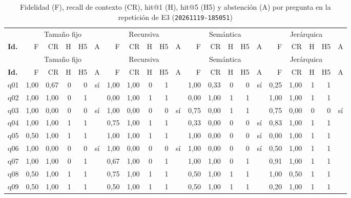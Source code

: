 \begin{scriptsize}
\setlength{\tabcolsep}{1.8pt}\renewcommand{\arraystretch}{0.92}
\begin{longtable}{@{}l rrrrc rrrrc rrrrc rrrrc@{}}
\caption[Ejecución repetida de E3, por pregunta]{Fidelidad (F), recall de contexto (CR), hit@1 (H), hit@5 (H5) y abstención (A) por pregunta en la repetición de E3 (\texttt{20261119-185051})}\label{tab:ap-e3-rep} \\
\toprule
& \multicolumn{5}{c}{Tamaño fijo} & \multicolumn{5}{c}{Recursiva} & \multicolumn{5}{c}{Semántica} & \multicolumn{5}{c}{Jerárquica} \\
\cmidrule(lr){2-6}\cmidrule(lr){7-11}\cmidrule(lr){12-16}\cmidrule(lr){17-21}
\textbf{Id.} & F & CR & H & H5 & A & F & CR & H & H5 & A & F & CR & H & H5 & A & F & CR & H & H5 & A \\
\midrule
\endfirsthead
\toprule
& \multicolumn{5}{c}{Tamaño fijo} & \multicolumn{5}{c}{Recursiva} & \multicolumn{5}{c}{Semántica} & \multicolumn{5}{c}{Jerárquica} \\
\cmidrule(lr){2-6}\cmidrule(lr){7-11}\cmidrule(lr){12-16}\cmidrule(lr){17-21}
\textbf{Id.} & F & CR & H & H5 & A & F & CR & H & H5 & A & F & CR & H & H5 & A & F & CR & H & H5 & A \\
\midrule
\endhead
q01 & 1,00 & 0,67 & 0 & 0 & sí & 1,00 & 1,00 & 0 & 1 &  & 1,00 & 0,33 & 0 & 0 & sí & 0,25 & 1,00 & 1 & 1 &  \\
q02 & 1,00 & 1,00 & 0 & 1 &  & 0,00 & 1,00 & 1 & 1 &  & 0,00 & 1,00 & 1 & 1 &  & 1,00 & 1,00 & 1 & 1 &  \\
q03 & 1,00 & 0,00 & 0 & 0 & sí & 1,00 & 0,00 & 0 & 0 & sí & 0,75 & 0,00 & 1 & 1 &  & 0,75 & 0,00 & 0 & 0 & sí \\
q04 & 1,00 & 1,00 & 1 & 1 &  & 0,75 & 1,00 & 1 & 1 &  & 0,33 & 0,00 & 0 & 0 & sí & 0,83 & 1,00 & 1 & 1 &  \\
q05 & 0,50 & 1,00 & 1 & 1 &  & 1,00 & 1,00 & 1 & 1 &  & 1,00 & 0,00 & 0 & 0 & sí & 0,00 & 1,00 & 1 & 1 &  \\
q06 & 1,00 & 0,00 & 0 & 0 & sí & 1,00 & 0,00 & 0 & 0 & sí & 1,00 & 0,00 & 0 & 0 & sí & 0,50 & 1,00 & 1 & 1 &  \\
q07 & 1,00 & 1,00 & 0 & 1 &  & 0,67 & 1,00 & 0 & 1 &  & 1,00 & 1,00 & 0 & 1 &  & 0,91 & 1,00 & 1 & 1 &  \\
q08 & 0,50 & 1,00 & 1 & 1 &  & 0,75 & 1,00 & 1 & 1 &  & 0,50 & 1,00 & 1 & 1 &  & 1,00 & 0,50 & 1 & 1 &  \\
q09 & 0,50 & 1,00 & 1 & 1 &  & 0,50 & 1,00 & 1 & 1 &  & 0,50 & 1,00 & 1 & 1 &  & 0,20 & 1,00 & 1 & 1 &  \\

\end{longtable}
\end{scriptsize}
